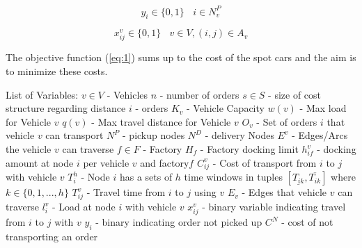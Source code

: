 \documentclass[a4paper,12pt]{article}
\begin{document}
\begin{equation} \label{eq:14}
y_i \in \{0, 1\} ~~~~ i \in N_v^P
\end{equation}

\begin{equation} \label{eq:15}
x_{ij}^v \in \{0, 1\} ~~~~ v \in V, (i, j) \in A_v
\end{equation}





\par
The objective function (\ref{eq:1}) sums up to the cost of the spot cars and the aim is to minimize these costs. \newline \newline


List of Variables: \newline
$v \in V$ - Vehicles \newline
$n$ - number of orders\newline
$s \in S$ - size of cost structure regarding distance \newline
$i$ - orders\newline
$K_v$ - Vehicle Capacity \newline
$w(v)$ - Max load for Vehicle $v$ \newline
$q(v)$ - Max travel distance for Vehicle $v$ \newline
$O_v$ - Set of orders $i$ that vehicle $v$ can transport \newline
$N^P$ - pickup nodes\newline
$N^D$ - delivery Nodes\newline
$E^v$ - Edges/Arcs the vehicle $v$ can traverse
$f \in F$ - Factory\newline
$H_f$ - Factory docking limit\newline
$h_{if}^v$ - docking amount at node $i$ per vehicle $v$ and factory$f$ \newline
$C_{ij}^{v}$ - Cost of transport from $i$ to $j$ with vehicle $v$ \newline
$T_i^h$ - Node $i$ has a sets of $h$ time windows in tuples $[ \underline{T_{ik}},  \overline{T_{ik}} ]$ where $k \in \{0,1,...,h\}$  \newline
$T_{ij}^v$ - Travel time from $i$ to $j$ using $v$
$E_v$ - Edges that vehicle $v$ can traverse \newline
$l_{i}^v$ - Load at node $i$ with vehicle $v$ \newline
$x_{ij}^v$ - binary variable indicating travel from $i$ to $j$ with $v$ \newline
$y_i$ - binary indicating order not picked up \newline
$C^N$ - cost of not transporting an order \newline
\end{document}
